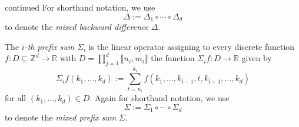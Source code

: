 \documentclass[
    t,10pt,
    handout
]{beamer}
\begin{document}
\begin{frame}
    \begin{definition*}{continued}
	For shorthand notation, we use 
	\begin{equation*}
	    \Delta := \Delta_1 \circ \cdots \circ \Delta_d
	\end{equation*}
	to denote the \emph{mixed backward difference} \( \Delta \). 
    \end{definition*}
\end{frame}

\begin{frame}
    \begin{definition*}{}
	The \emph{\( i \)-th prefix sum} \( \Sigma_i \) is the linear operator assigning to every discrete function \( f: D \subseteq \mathbb Z^d \to \mathbb R \) with \( D = \prod_{j=1}^d \llbracket n_i, m_i \rrbracket \) the function \( \Sigma_i f : D \to \mathbb R \) given by 
	\begin{equation*}
	    \Sigma_i f(k_1, \dots, k_d) := \sum_{t = n_i}^{k_i} f(k_1, \dots, k_{i-1}, t, k_{i+1}, \dots, k_d)
	\end{equation*}
	for all \( (k_1, \dots, k_d) \in D \).
	Again for shorthand notation, we  use
	\begin{equation*}
	    \Sigma := \Sigma_1 \circ \cdots \circ \Sigma_d
	\end{equation*}
	to denote the \emph{mixed prefix sum} \( \Sigma \).
    \end{definition*}
\end{frame}
\end{document}
